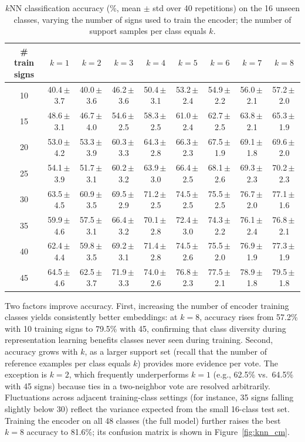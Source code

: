 \documentclass{article}
\begin{document}
\begin{table}[h!]
\centering
\scriptsize
\begin{tabular}{ccccccccc}
\toprule
\# train signs & $k=1$ & $k=2$ & $k=3$ & $k=4$ & $k=5$ & $k=6$ & $k=7$ & $k=8$ \\
\midrule
10 & 40.4\,$\pm$\,3.7 & 40.0\,$\pm$\,3.6 & 46.2\,$\pm$\,3.6 & 50.4\,$\pm$\,3.1 & 53.2\,$\pm$\,2.4 & 54.9\,$\pm$\,2.2 & 56.0\,$\pm$\,2.1 & 57.2\,$\pm$\,2.0 \\
15 & 48.6\,$\pm$\,3.1 & 46.7\,$\pm$\,4.0 & 54.6\,$\pm$\,2.5 & 58.3\,$\pm$\,2.5 & 61.0\,$\pm$\,2.4 & 62.7\,$\pm$\,2.5 & 63.8\,$\pm$\,2.1 & 65.3\,$\pm$\,1.9 \\
20 & 53.0\,$\pm$\,4.2 & 53.3\,$\pm$\,3.9 & 60.3\,$\pm$\,3.3 & 64.3\,$\pm$\,2.8 & 66.3\,$\pm$\,2.3 & 67.5\,$\pm$\,1.9 & 69.1\,$\pm$\,1.8 & 69.6\,$\pm$\,2.0 \\
25 & 54.1\,$\pm$\,3.9 & 51.7\,$\pm$\,3.1 & 60.2\,$\pm$\,3.2 & 63.9\,$\pm$\,3.0 & 66.4\,$\pm$\,2.5 & 68.1\,$\pm$\,2.6 & 69.3\,$\pm$\,2.3 & 70.2\,$\pm$\,2.3 \\
30 & 63.5\,$\pm$\,4.5 & 60.9\,$\pm$\,3.5 & 69.5\,$\pm$\,2.9 & 71.2\,$\pm$\,2.5 & 74.5\,$\pm$\,2.5 & 75.5\,$\pm$\,2.5 & 76.7\,$\pm$\,2.0 & 77.1\,$\pm$\,1.6 \\
35 & 59.9\,$\pm$\,4.6 & 57.5\,$\pm$\,3.1 & 66.4\,$\pm$\,3.2 & 70.1\,$\pm$\,2.8 & 72.4\,$\pm$\,3.0 & 74.3\,$\pm$\,2.2 & 76.1\,$\pm$\,2.4 & 76.8\,$\pm$\,2.1 \\
40 & 62.4\,$\pm$\,4.4 & 59.8\,$\pm$\,3.5 & 69.2\,$\pm$\,3.1 & 71.4\,$\pm$\,2.8 & 74.5\,$\pm$\,2.6 & 75.5\,$\pm$\,2.0 & 76.9\,$\pm$\,1.9 & 77.3\,$\pm$\,1.9 \\
45 & 64.5\,$\pm$\,4.6 & 62.5\,$\pm$\,3.7 & 71.9\,$\pm$\,3.3 & 74.0\,$\pm$\,2.6 & 76.8\,$\pm$\,2.3 & 77.5\,$\pm$\,2.1 & 78.9\,$\pm$\,1.8 & 79.5\,$\pm$\,1.8 \\
\bottomrule
\end{tabular}
\caption{$k$NN classification accuracy (\%, mean $\pm$ std over 40 repetitions) on the 16 unseen classes, varying the number of signs used to train the encoder; the number of support samples per class equals $k$.}
\label{table:knn}
\end{table}

Two factors improve accuracy. First, increasing the number of encoder training classes yields consistently better embeddings: at $k=8$, accuracy rises from 57.2\% with 10 training signs to 79.5\% with 45, confirming that class diversity during representation learning benefits classes never seen during training. Second, accuracy grows with $k$, as a larger support set (recall that the number of reference examples per class equals $k$) provides more evidence per vote. The exception is $k=2$, which frequently underperforms $k=1$ (e.g., 62.5\% vs.\ 64.5\% with 45 signs) because ties in a two-neighbor vote are resolved arbitrarily. Fluctuations across adjacent training-class settings (for instance, 35 signs falling slightly below 30) reflect the variance expected from the small 16-class test set. Training the encoder on all 48 classes (the full model) further raises the best $k=8$ accuracy to 81.6\%; its confusion matrix is shown in Figure~\ref{fig:knn_cm}.
\end{document}
